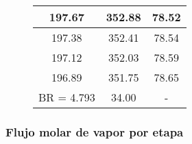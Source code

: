 \begin{figure}[H]
\begin{tabular}{|c|c|c|}
        \hline
        197.67         & 352.88          & 78.52                        \\
        \hline
        197.38         & 352.41          & 78.54                        \\
        \hline
        197.12         & 352.03          & 78.59                        \\
        \hline
        196.89         & 351.75          & 78.65                        \\
        \hline
        BR = 4.793     & 34.00           & -                            \\
        \hline
    \end{tabular}
    \normalsize
\end{figure}

\newpage

\subsubsection{Flujo molar de vapor por etapa}

